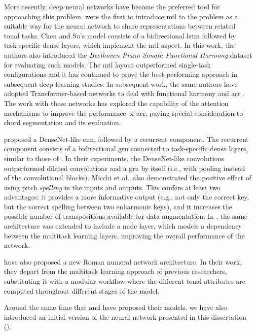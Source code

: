 More recently, deep neural networks have become the
preferred tool for approaching this problem.
\textcite{chen2018functional} were the first to introduce
\gls{mtl} \parencite{ruder2017overview} to the problem as a
suitable way for the neural network to share representations
between related tonal tasks. Chen and Su's model consists of
a bidirectional \gls{lstm} \parencite{hochreiter1997long}
followed by task-specific dense layers, which implement the
\gls{mtl} aspect. In this work, the authors also introduced
the \emph{Beethoven Piano Sonata Functional Harmony} dataset
for evaluating such models. The \gls{mtl} layout
outperformed single-task configurations and it has continued
to prove the best-performing approach in subsequent deep
learning studies. In subsequent work, the same authors have
adopted Transformer-based networks to deal with functional
harmony and \gls{acr} \parencite{chen2019harmony,
chen2021attend}. The work with these networks has explored
the capability of the attention mechanisms to improve the
performance of \gls{acr}, paying special consideration to
chord segmentation and its evaluation.

\textcite{micchi2020not} proposed a DenseNet-like
\parencite{huang2017densely} \gls{cnn}, followed by a
recurrent component. The recurrent component consists of a
bidirectional \gls{gru} \parencite{cho2014learning}
connected to task-specific dense layers, similar to those of
\textcite{chen2018functional}. In their experiments, the
DenseNet-like convolutions outperformed dilated convolutions
and a \gls{gru} by itself (i.e., with pooling instead of the
convolutional blocks). Micchi et al.~also demonstrated the
positive effect of using pitch \textit{spelling} in the
inputs and outputs. This confers at least two advantages: it
provides a more informative output (e.g., not only the
correct key, but the correct spelling between two enharmonic
keys), and it increases the possible number of
transpositions available for data augmentation. In
\textcite{micchi2021deep}, the same architecture was
extended to include a \gls{nade} layer, which models a
dependency between the multitask learning layers, improving
the overall performance of the network.

\textcite{mcleod2021modular} have also proposed a new Roman
numeral network architecture. In their work, they depart
from the multitask learning approach of previous
researchers, substituting it with a modular workflow where
the different tonal attributes are computed throughout
different stages of the model.

Around the same time that \textcite{micchi2021deep} and
\textcite{mcleod2021modular} have proposed their models, we
have also introduced an initial version of the neural
network presented in this dissertation
(\parencite{napoleslopez2021augmentednet}).
